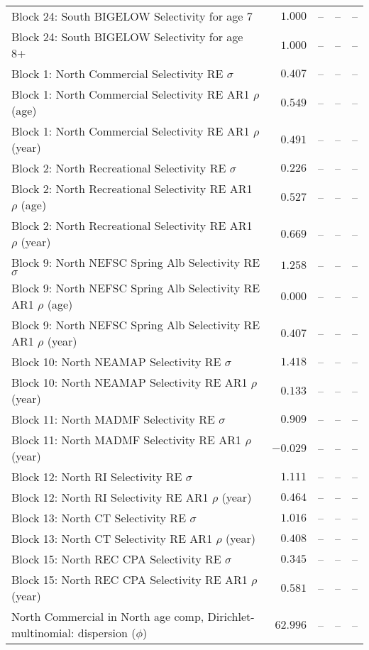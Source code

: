 \documentclass[
]{article}
\begin{document}
\begin{landscape}
\begin{longtable}[t]{lrrrr}
Block 24: South BIGELOW Selectivity for age 7 & $1.000$ & -- & -- & --\\
Block 24: South BIGELOW Selectivity for age 8+ & $1.000$ & -- & -- & --\\
Block 1: North Commercial Selectivity RE $\sigma$ & $0.407$ & -- & -- & --\\
\addlinespace
Block 1: North Commercial Selectivity RE AR1 $\rho$ (age) & $0.549$ & -- & -- & --\\
Block 1: North Commercial Selectivity RE AR1 $\rho$ (year) & $0.491$ & -- & -- & --\\
Block 2: North Recreational Selectivity RE $\sigma$ & $0.226$ & -- & -- & --\\
Block 2: North Recreational Selectivity RE AR1 $\rho$ (age) & $0.527$ & -- & -- & --\\
Block 2: North Recreational Selectivity RE AR1 $\rho$ (year) & $0.669$ & -- & -- & --\\
\addlinespace
Block 9: North NEFSC Spring Alb Selectivity RE $\sigma$ & $1.258$ & -- & -- & --\\
Block 9: North NEFSC Spring Alb Selectivity RE AR1 $\rho$ (age) & $0.000$ & -- & -- & --\\
Block 9: North NEFSC Spring Alb Selectivity RE AR1 $\rho$ (year) & $0.407$ & -- & -- & --\\
Block 10: North NEAMAP Selectivity RE $\sigma$ & $1.418$ & -- & -- & --\\
Block 10: North NEAMAP Selectivity RE AR1 $\rho$ (year) & $0.133$ & -- & -- & --\\
\addlinespace
Block 11: North MADMF Selectivity RE $\sigma$ & $0.909$ & -- & -- & --\\
Block 11: North MADMF Selectivity RE AR1 $\rho$ (year) & $-0.029$ & -- & -- & --\\
Block 12: North RI Selectivity RE $\sigma$ & $1.111$ & -- & -- & --\\
Block 12: North RI Selectivity RE AR1 $\rho$ (year) & $0.464$ & -- & -- & --\\
Block 13: North CT Selectivity RE $\sigma$ & $1.016$ & -- & -- & --\\
\addlinespace
Block 13: North CT Selectivity RE AR1 $\rho$ (year) & $0.408$ & -- & -- & --\\
Block 15: North REC CPA Selectivity RE $\sigma$ & $0.345$ & -- & -- & --\\
Block 15: North REC CPA Selectivity RE AR1 $\rho$ (year) & $0.581$ & -- & -- & --\\
North Commercial in North age comp, Dirichlet-multinomial: dispersion ($\phi$) & $62.996$ & -- & -- & --\\

\end{longtable}
\end{landscape}
\end{document}
